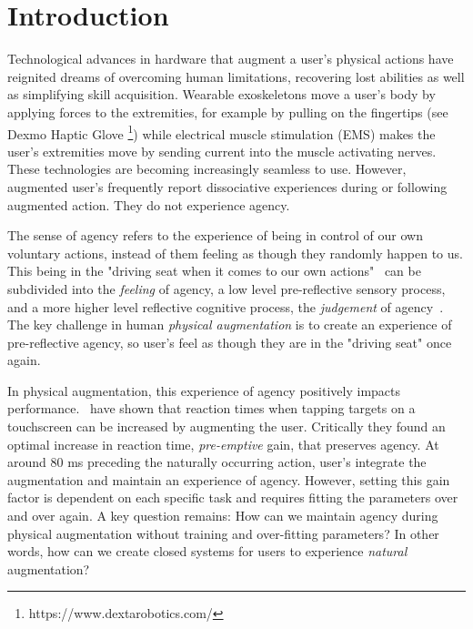 \section{Introduction}
Technological advances in hardware that augment a user's physical actions have reignited dreams of overcoming human limitations, recovering lost abilities as well as simplifying skill acquisition. Wearable exoskeletons move a user's body by applying forces to the extremities, for example by pulling on the fingertips (see Dexmo Haptic Glove \footnote{https://www.dextarobotics.com/}) while electrical muscle stimulation (EMS) makes the user's extremities move by sending current into the muscle activating nerves. These technologies are becoming increasingly seamless to use. However, augmented user's frequently report dissociative experiences during or following augmented action. They do not experience agency.

The sense of agency refers to the experience of being in control of our own voluntary actions, instead of them feeling as though they randomly happen to us. This being in the "driving seat when it comes to our own actions"~\cite{Moore2016-ub} can be subdivided into the \textit{feeling} of agency, a low level pre-reflective sensory process, and a more higher level reflective cognitive process, the \textit{judgement} of agency~\cite{Moore2016-ub, Danry2022-xk}. The key challenge in human \textit{physical augmentation} is to create an experience of pre-reflective agency, so user's feel as though they are in the "driving seat" once again.

In physical augmentation, this experience of agency positively impacts performance.~\citet{Kasahara2019-sk} have shown that reaction times when tapping targets on a touchscreen can be increased by augmenting the user. Critically they found an optimal increase in reaction time, \textit{pre-emptive} gain, that preserves agency. At around 80 ms preceding the naturally occurring action, user's integrate the augmentation and maintain an experience of agency. However, setting this gain factor is dependent on each specific task and requires fitting the parameters over and over again. A key question remains: How can we maintain agency during physical augmentation without training and over-fitting parameters? In other words, how can we create closed systems for users to experience \textit{natural} augmentation?

